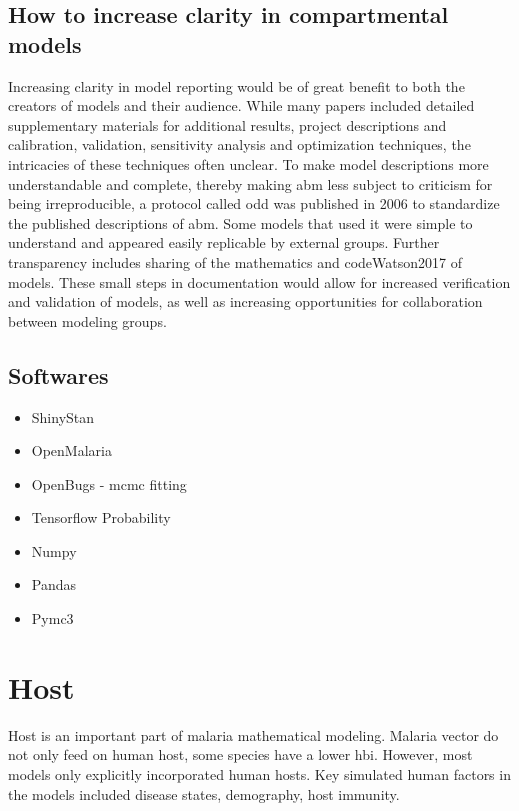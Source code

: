 \documentclass[a4paper, 12pt, twoside]{article}
\begin{document}
\subsection{How to increase clarity in compartmental models}%
\label{sub:incresing_clarity}
Increasing clarity in model reporting would be of great benefit to both the creators of models and their audience.
While many papers included detailed supplementary materials for additional results, project descriptions and calibration, validation, sensitivity analysis and optimization techniques, the intricacies of these techniques often unclear.
To make model descriptions more understandable and complete, thereby making \gls{abm} less subject to criticism for being irreproducible, a protocol called \gls{odd} \cite{Grimm2010} was published in 2006 to standardize the published descriptions of \gls{abm}.
Some models that used it \cite{Zhu2015, Zhu2015a, Watson2017} were simple to understand and appeared easily replicable by external groups.
Further transparency includes sharing of the mathematics and code{Watson2017} of models.
These small steps in documentation would allow for increased verification and validation of models, as well as increasing opportunities for collaboration between modeling groups.

\subsection{Softwares}

\begin{itemize}
	\item ShinyStan
	\item OpenMalaria
	\item OpenBugs - \gls{mcmc} fitting \cite{Lunn2009}
	\item Tensorflow Probability
	\item Numpy
	\item Pandas
	\item Pymc3
\end{itemize}

\section{Host}%
\label{sec:Host}
Host is an important part of malaria mathematical modeling.
Malaria vector do not only feed on human host, some species have a lower \gls{hbi}.
However, most models only explicitly incorporated human hosts.
Key simulated human factors in the models included disease states, demography, host immunity.
\end{document}
